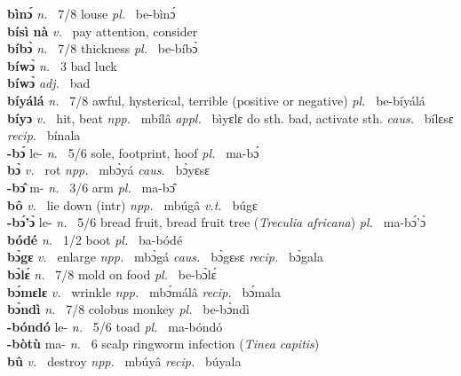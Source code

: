 {\bfseries bìnɔ́}  {\itshape n.~} 7/8 louse {\itshape pl.~} be-bìnɔ́    \\ 
{\bfseries bísì nà}  {\itshape v.~} pay attention, consider    \\ 
{\bfseries bíbɔ̀}  {\itshape n.~} 7/8 thickness {\itshape pl.~} be-bíbɔ̀    \\ 
{\bfseries bíwɔ̀}  {\itshape n.~} 3 bad luck \\ 
{\bfseries bíwɔ̀}  {\itshape adj.~} bad    \\ 
{\bfseries bíyálá}  {\itshape n.~} 7/8 awful, hysterical, terrible (positive or negative) {\itshape pl.~} be-bíyálá    \\ 
{\bfseries bíyɔ}  {\itshape v.~} hit, beat   {\itshape npp.~} mbílâ {\itshape appl.~} bìyɛlɛ do sth. bad, activate sth. {\itshape caus.~} bílɛsɛ {\itshape recip.~} bínala  \\ 
{\bfseries -bɔ́} le- {\itshape n.~} 5/6 sole, footprint, hoof {\itshape pl.~} ma-bɔ́    \\ 
{\bfseries bɔ̀}  {\itshape v.~} rot   {\itshape npp.~} mbɔ̀yá {\itshape caus.~} bɔ̀yɛsɛ  \\ 
{\bfseries -bɔ̂} m- {\itshape n.~} 3/6 arm {\itshape pl.~} ma-bɔ̂    \\ 
{\bfseries bô}  {\itshape v.~} lie down (intr)   {\itshape npp.~} mbúgâ {\itshape v.t.~} búgɛ  \\ 
{\bfseries -bɔ́'ɔ̀} le- {\itshape n.~} 5/6 bread fruit, bread fruit tree ({\itshape Treculia africana}) {\itshape pl.~} ma-bɔ́'ɔ̀    \\ 
{\bfseries bódé}  {\itshape n.~} 1/2 boot {\itshape pl.~} ba-bódé    \\ 
{\bfseries bɔ̀gɛ}  {\itshape v.~} enlarge   {\itshape npp.~} mbɔ̀gá {\itshape caus.~} bɔ̀gɛsɛ {\itshape recip.~} bɔ̀gala  \\ 
{\bfseries bɔ̀lɛ́}  {\itshape n.~} 7/8 mold on food {\itshape pl.~} be-bɔ̀lɛ́    \\ 
{\bfseries bɔ́mɛlɛ}  {\itshape v.~} wrinkle    {\itshape npp.~} mbɔ́málâ {\itshape recip.~} bɔ́mala  \\ 
{\bfseries bɔ̀ndì}  {\itshape n.~} 7/8 colobus monkey {\itshape pl.~} be-bɔ̀ndì    \\ 
{\bfseries -bóndó} le- {\itshape n.~} 5/6 toad {\itshape pl.~} ma-bóndó    \\ 
{\bfseries -bòtù} ma- {\itshape n.~} 6 scalp ringworm infection ({\itshape Tinea capitis})    \\ 
{\bfseries bû}  {\itshape v.~} destroy   {\itshape npp.~} mbúyâ {\itshape recip.~} búyala  \\ 
